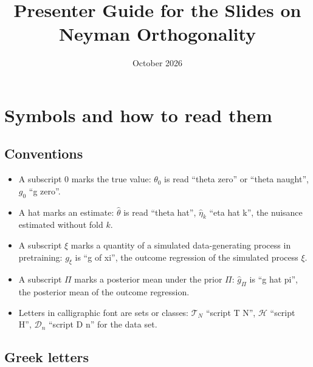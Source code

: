 \documentclass[11pt]{article}
\title{Presenter Guide for the Slides on Neyman Orthogonality}
\author{}
\date{October 2026}
\begin{document}
\maketitle
\tableofcontents

\section{Symbols and how to read them}

\subsection{Conventions}

\begin{itemize}
\item A subscript $0$ marks the true value: $\theta_0$ is read ``theta zero'' or ``theta naught'', $g_0$ ``g zero''.
\item A hat marks an estimate: $\hat\theta$ is read ``theta hat'', $\hat\eta_k$ ``eta hat k'', the nuisance estimated without fold $k$.
\item A subscript $\xi$ marks a quantity of a simulated data-generating process in pretraining: $g_\xi$ is ``g of xi'', the outcome regression of the simulated process $\xi$.
\item A subscript $\Pi$ marks a posterior mean under the prior $\Pi$: $\hat g_\Pi$ is ``g hat pi'', the posterior mean of the outcome regression.
\item Letters in calligraphic font are sets or classes: $\mathcal T_N$ ``script T N'', $\mathcal H$ ``script H'', $\mathcal D_n$ ``script D n'' for the data set.
\end{itemize}

\subsection{Greek letters}
\end{document}
